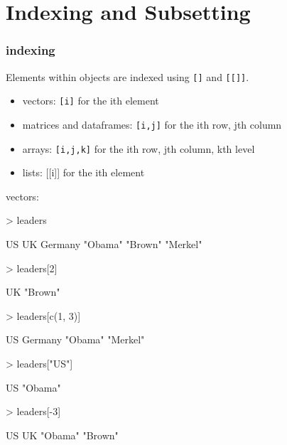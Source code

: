 \documentclass[handout]{beamer}
\newcommand{\red}{\color{red}}
\begin{document}
\section{Indexing and Subsetting}
\begin{frame}[fragile]
\frametitle{indexing}
Elements within objects are indexed using {\tt []} and {\tt [[]]}.
\pause
\bigskip
\begin{itemize}
\item vectors: {\tt [i]} for the ith element
\pause
\item matrices and dataframes: {\tt [i,j]} for the ith row, jth column
\pause
\item arrays: {\tt [i,j,k]} for the ith row, jth column, kth level
\pause
\item lists: [[i]] for the ith element
\end{itemize}
\end{frame}

\begin{frame}[fragile]
vectors:
\bigskip
\red
\footnotesize
\begin{Schunk}
\begin{Sinput}
> leaders
\end{Sinput}
\begin{Soutput}
      US       UK  Germany 
 "Obama"  "Brown" "Merkel" 
\end{Soutput}
\end{Schunk}
\pause
\bigskip
\begin{Schunk}
\begin{Sinput}
> leaders[2]
\end{Sinput}
\begin{Soutput}
     UK 
"Brown" 
\end{Soutput}
\end{Schunk}
\pause
\bigskip
\begin{Schunk}
\begin{Sinput}
> leaders[c(1, 3)]
\end{Sinput}
\begin{Soutput}
      US  Germany 
 "Obama" "Merkel" 
\end{Soutput}
\end{Schunk}
\end{frame}

\begin{frame}[fragile]
\red
\footnotesize
\begin{Schunk}
\begin{Sinput}
> leaders["US"]
\end{Sinput}
\begin{Soutput}
     US 
"Obama" 
\end{Soutput}
\end{Schunk}
\pause
\bigskip
\begin{Schunk}
\begin{Sinput}
> leaders[-3]
\end{Sinput}
\begin{Soutput}
     US      UK 
"Obama" "Brown" 
\end{Soutput}
\end{Schunk}
\end{frame}
\end{document}
